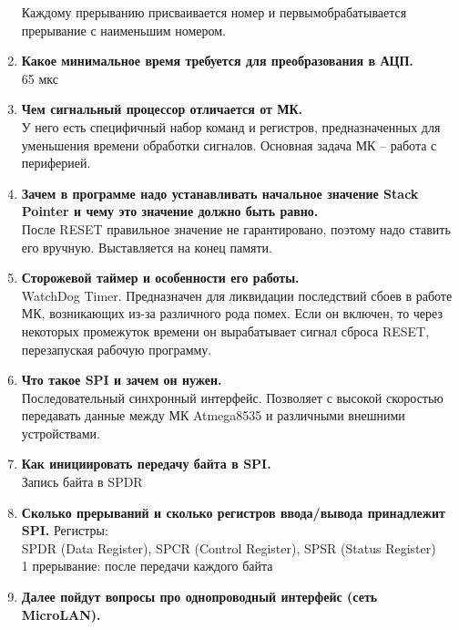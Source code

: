 \documentclass[a4paper, 12pt, twoside]{article}
\begin{document}
\begin{enumerate}
		Каждому прерыванию присваивается номер и первымобрабатывается прерывание с наименьшим номером.
	\item \textbf{Какое минимальное время требуется для преобразования в АЦП.}\\
		65 мкс
	\item \textbf{Чем сигнальный процессор отличается от МК.}\\
		У него есть специфичный набор команд и регистров, предназначенных для уменьшения времени обработки сигналов. Основная задача МК – работа с периферией.
	\item \textbf{Зачем в программе надо устанавливать начальное значение Stack Pointer
и чему это значение должно быть равно.}\\
		После RESET правильное значение не гарантировано, поэтому надо ставить его вручную. Выставляется на конец памяти.
	\item \textbf{Сторожевой таймер и особенности его работы.}\\
		WatchDog Timer. Предназначен для ликвидации последствий сбоев в работе МК, возникающих из-за различного рода помех. Если он включен, то через некоторых промежуток времени он вырабатывает сигнал сброса RESET, перезапуская рабочую программу.
	\item \textbf{Что такое SPI и зачем он нужен.}\\
		Последовательный синхронный интерфейс. Позволяет с высокой скоростью передавать данные между МК Atmega8535 и различными внешними устройствами.
	\item \textbf{Как инициировать передачу байта в SPI.}\\
		Запись байта в SPDR
	\item \textbf{Сколько прерываний и сколько регистров ввода/вывода принадлежит SPI.}
		Регистры:\\
		SPDR (Data Register), SPCR (Control Register), SPSR (Status Register)\\
		1 прерывание: после передачи каждого байта
	\item \textbf{Далее пойдут вопросы про однопроводный интерфейс (сеть MicroLAN).}\\


\end{enumerate}
\end{document}
